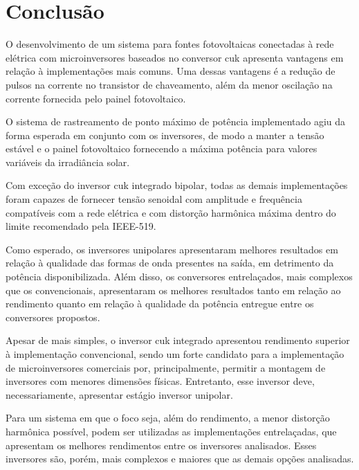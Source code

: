 \documentclass[
	12pt,				%
	openright,			%
	twoside,			%
	a4paper,			%
	english,			%
	french,				%
	spanish,			%
	brazil,				%
	]{abntex2}
\begin{document}
\chapter{Conclusão}


O desenvolvimento de um sistema para fontes fotovoltaicas conectadas à rede elétrica com microinversores baseados no conversor cuk apresenta vantagens em relação à implementações mais comuns. Uma dessas vantagens é a redução de pulsos na corrente no transistor de chaveamento, além da menor oscilação na corrente fornecida pelo painel fotovoltaico.

O sistema de rastreamento de ponto máximo de potência implementado agiu da forma esperada em conjunto com os inversores, de modo a manter a tensão estável e o painel fotovoltaico fornecendo a máxima potência para valores variáveis da irradiância solar.

Com exceção do inversor cuk integrado bipolar, todas as demais implementações foram capazes de fornecer tensão senoidal com amplitude e frequência compatíveis com a rede elétrica e com distorção harmônica máxima dentro do limite recomendado pela IEEE-519.

Como esperado, os inversores unipolares apresentaram melhores resultados em relação à qualidade das formas de onda presentes na saída, em detrimento da potência disponibilizada. Além disso, os conversores entrelaçados, mais complexos que os convencionais, apresentaram os melhores resultados tanto em relação ao rendimento quanto em relação à qualidade da potência entregue entre os conversores propostos. 

Apesar de mais simples, o inversor cuk integrado apresentou rendimento superior à implementação convencional, sendo um forte candidato para a implementação de microinversores comerciais por, principalmente, permitir a montagem de inversores com menores dimensões físicas. Entretanto, esse inversor deve, necessariamente, apresentar estágio inversor unipolar.

Para um sistema em que o foco seja, além do rendimento, a menor distorção harmônica possível, podem ser utilizadas as implementações entrelaçadas, que apresentam os melhores rendimentos entre os inversores analisados. Esses inversores são, porém, mais complexos e maiores que as demais opções analisadas.
\end{document}

